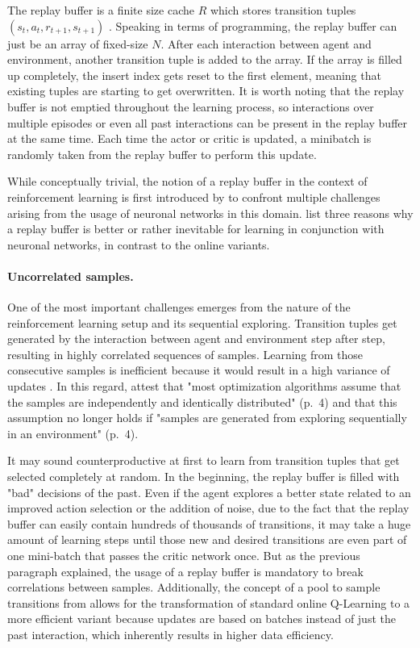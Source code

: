 The replay buffer is a finite size cache $R$ which stores transition tuples $(s_t, a_t, r_{t+1},s_{t+1})$ \cite[p.~4]{mnih2013playing}. Speaking in terms of programming, the replay buffer can just be an array of fixed-size $N$. After each interaction between agent and environment, another transition tuple is added to the array. If the array is filled up completely, the insert index gets reset to the first element, meaning that existing tuples are starting to get overwritten. It is worth noting that the replay buffer is not emptied throughout the learning process, so interactions over multiple episodes or even all past interactions can be present in the replay buffer at the same time. Each time the actor or critic is updated, a minibatch is randomly taken from the replay buffer to perform this update.
\par 
While conceptually trivial, the notion of a replay buffer in the context of reinforcement learning is first introduced by \cite{lin1992reinforcement} to confront multiple challenges arising from the usage of neuronal networks in this domain. \cite{mnih2013playing} list three reasons why a replay buffer is better or rather inevitable for learning in conjunction with neuronal networks, in contrast to  the online variants.
\paragraph{Uncorrelated samples.} One of the most important  challenges emerges from the nature of the reinforcement learning setup and its sequential exploring.  Transition tuples get generated by the interaction between agent and environment step after step, resulting in highly correlated sequences of samples. Learning from those consecutive samples is inefficient because it would result in a high variance of updates \cite[p.~5]{mnih2013playing}. In this regard, \cite{lillicrap2019continuous} attest that "most optimization algorithms assume that the samples are independently and identically distributed" (p.~4) and that this assumption no longer holds if "samples are generated from exploring sequentially in an environment" (p.~4).
\par
It may sound counterproductive at first to learn from transition tuples that get selected completely at random. In the beginning, the replay buffer is filled with "bad" decisions of the past. Even if the agent explores a better state related to an improved action selection or the addition of noise, due to the fact that the replay buffer can easily contain hundreds of thousands of transitions, it may take a huge amount of learning steps until those new and desired transitions are even part of one mini-batch that passes the critic network once. But as the previous paragraph explained, the usage of a replay buffer is mandatory to break correlations between samples. Additionally, the concept of a pool to sample transitions from allows for the transformation of standard online Q-Learning to a more efficient variant because updates are based on batches instead of just the past interaction, which inherently results in higher data efficiency.

